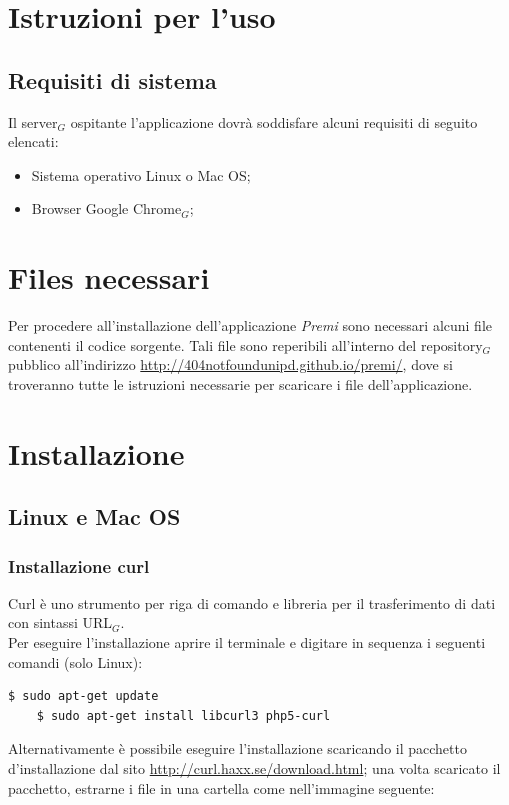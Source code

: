 \section{Istruzioni per l'uso}
\subsection{Requisiti di sistema}
Il server$_G$ ospitante l'applicazione dovrà soddisfare alcuni requisiti di seguito elencati:
\begin{itemize}
\item Sistema operativo Linux o Mac OS;
\item Browser Google Chrome$_G$;
\end{itemize}

\section{Files necessari}
Per procedere all'installazione dell'applicazione \emph{Premi} sono necessari alcuni file contenenti il codice sorgente.
Tali file sono reperibili all'interno del repository$_G$ pubblico all'indirizzo \href{http://404notfoundunipd.github.io/premi/}{http://404notfoundunipd.github.io/premi/}, dove si troveranno tutte le istruzioni necessarie per scaricare i file dell'applicazione.

\section{Installazione}
\subsection{Linux e Mac OS}

\subsubsection{Installazione curl}
Curl è uno strumento per riga di comando e libreria per il trasferimento di dati con sintassi URL$_G$. \\

Per eseguire l'installazione aprire il terminale e digitare in sequenza i seguenti comandi (solo Linux):

\begin{lstlisting}[style=DOS]
	$ sudo apt-get update
	$ sudo apt-get install libcurl3 php5-curl
\end{lstlisting}

Alternativamente è possibile eseguire l'installazione scaricando il pacchetto d'installazione dal sito \href{http://curl.haxx.se/download.html}{http://curl.haxx.se/download.html}; una volta scaricato il pacchetto, estrarne i file in una cartella come nell'immagine seguente:

